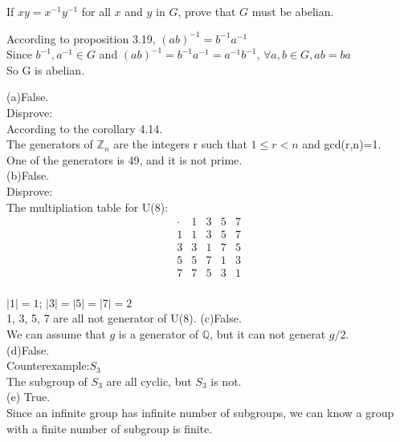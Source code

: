 \documentclass[a4paper, justified]{tufte-handout}
\begin{document}
\begin{problem}[TJ 3-51]
If $xy = x^{-1}y^{-1}$ for all $x$ and $y$ in $G$, prove that $G$ must be abelian.
\end{problem}

\begin{solution}
	According to proposition 3.19, $(ab)^{-1}=b^{-1}a^{-1}$\\
	Since $b^{-1}, a^{-1} \in G$ and $(ab)^{-1}=b^{-1}a^{-1}=a^{-1}b^{-1}$, $\forall a,b\in G, ab=ba$\\
	So G is abelian.
\end{solution}

\begin{problem}[TJ 4-1]
\end{problem}

\begin{solution}
	(a)False.\\
	Disprove:\\
	According to the corollary 4.14.\\
	The generators of $\mathbb{Z}_n$ are the integers r such that $1\leq r < n$ and gcd(r,n)=1.\\
	One of the generators is 49, and it is not prime.\\
	(b)False.\\
	Disprove:\\
	The multipliation table for U(8):\\
	$$
		\begin{array}{c|cccc}
			\cdot    & 1 & 3 & 5 & 7 \\
			\hline 1 & 1 & 3 & 5 & 7 \\
			3        & 3 & 1 & 7 & 5 \\
			5        & 5 & 7 & 1 & 3 \\
			7        & 7 & 5 & 3 & 1
		\end{array}
	$$\\
	$|1|=1$; $|3|=|5|=|7|=2$\\
	1, 3, 5, 7 are all not generator of U(8).
	(c)False.\\
	We can assume that $g$ is a generator of $\mathbb{Q}$, but it can not generat $g/2$.\\
	(d)False.\\
	Counterexample:$S_3$\\
	The subgroup of $S_3$ are all cyclic, but $S_3$ is not.\\
	(e) True.\\
	Since an infinite group has infinite number of subgroups, we can know a group with a finite number of subgroup is finite.\\

\end{solution}
\end{document}
